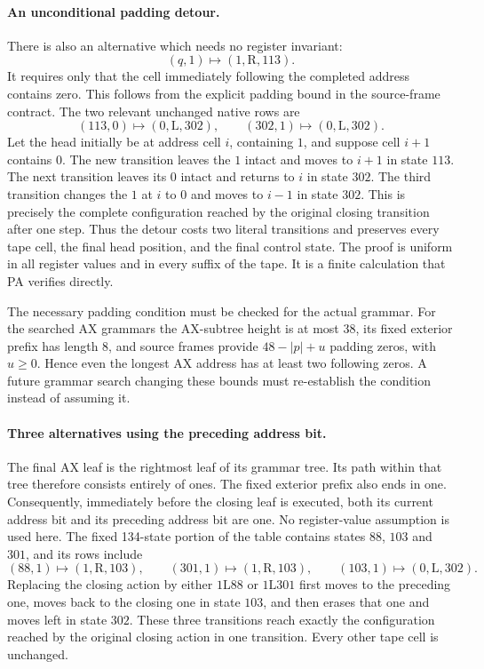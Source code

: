 \paragraph{An unconditional padding detour.}
There is also an alternative which needs no register invariant:
\[
                  (q,1)\longmapsto(1,\mathrm R,113).
\]
It requires only that the cell immediately following the completed address
contains zero.  This follows from the explicit padding bound in the
source-frame contract.  The two relevant unchanged native rows are
\[
 (113,0)\longmapsto(0,\mathrm L,302),\qquad
 (302,1)\longmapsto(0,\mathrm L,302).
\]
Let the head initially be at address cell $i$, containing $1$, and suppose
cell $i+1$ contains $0$.  The new transition leaves the $1$ intact and moves
to $i+1$ in state $113$.  The next transition leaves its $0$ intact and
returns to $i$ in state $302$.  The third transition changes the $1$ at $i$
to $0$ and moves to $i-1$ in state $302$.  This is precisely the complete
configuration reached by the original closing transition after one step.
Thus the detour costs two literal transitions and preserves every tape
cell, the final head position, and the final control state.  The proof is
uniform in all register values and in every suffix of the tape.  It is a
finite calculation that PA verifies directly.

The necessary padding condition must be checked for the actual grammar.
For the searched AX grammars the AX-subtree height is at most $38$, its
fixed exterior prefix has length $8$, and source frames provide
$48-|p|+u$ padding zeros, with $u\geq0$.  Hence even the longest AX address
has at least two following zeros.  A future grammar search changing these
bounds must re-establish the condition instead of assuming it.

\paragraph{Three alternatives using the preceding address bit.}
The final AX leaf is the rightmost leaf of its grammar tree.  Its path
within that tree therefore consists entirely of ones.  The fixed exterior
prefix also ends in one.  Consequently, immediately before the closing
leaf is executed, both its current address bit and its preceding address
bit are one.  No register-value assumption is used here.
The fixed 134-state portion of the table contains states $88$, $103$ and
$301$, and its rows include
\[
 (88,1)\longmapsto(1,\mathrm R,103),\qquad
 (301,1)\longmapsto(1,\mathrm R,103),\qquad
 (103,1)\longmapsto(0,\mathrm L,302).
\]
Replacing the closing action by either $1\mathrm L88$ or
$1\mathrm L301$ first moves to the preceding one, moves back to the
closing one in state $103$, and then erases that one and moves left in
state $302$.  These three transitions reach exactly the configuration
reached by the original closing action in one transition.  Every other
tape cell is unchanged.

